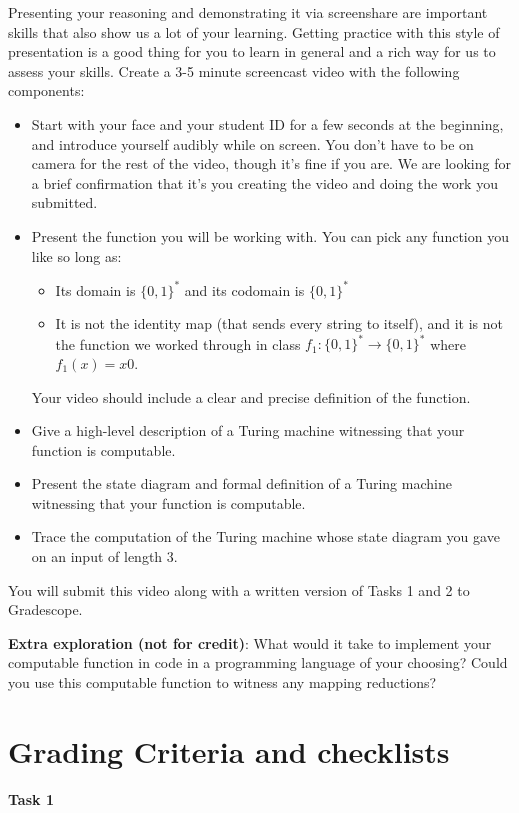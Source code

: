  Presenting your reasoning and demonstrating it via screenshare are important skills that 
 also show us a lot of your learning. Getting practice with this style of presentation is a 
 good thing for you to learn in general and a rich way for us to assess your skills. Create 
 a 3-5 minute screencast video with the following components:
 \begin{itemize}
	\item Start with your face and your student ID for a few seconds at the beginning, and introduce yourself audibly while on screen. 
	You don't have to be on camera for the rest of the video, though it's fine if you are. 
	We are looking for a brief confirmation that it's you creating the video and 
	doing the work you submitted.
	\item Present the function you will be working with. You can pick any function you like so long as:
	\begin{itemize}
		\item Its domain is $\{0,1\}^*$ and its codomain is $\{0,1\}^*$
		\item It is not the identity map (that sends every string to itself), and it is not the function we 
		worked through in class $f_1: \{0,1\}^* \to \{0,1\}^*$ where $f_1(x) = x0$.
	\end{itemize}
	Your video should include a clear and precise definition of the function.
	\item Give a high-level description of a Turing machine witnessing that your function is computable.
	\item Present the state diagram and formal definition of a Turing machine witnessing that your function is computable.
	\item Trace the computation of the Turing machine whose state diagram you gave on an input of length $3$.
\end{itemize}
You will submit this video along with a written version of Tasks 1 and 2 to Gradescope.

{\bf Extra exploration (not for credit)}: What would it take to implement your computable function in code in a programming language
of your choosing? Could you use this computable function to witness any mapping reductions?

	
\section{Grading Criteria and checklists}

{\bf Task 1}

